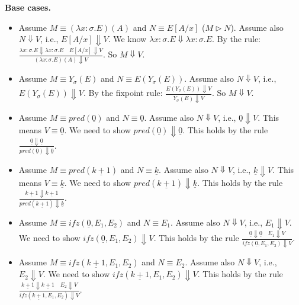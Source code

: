     \textbf{Base cases.}
    \begin{itemize}
        \item Assume $M \equiv (\lambda x:\sigma.E)(A)$ and $N \equiv E[A/x]$ ($M \rhd N$). Assume also $N \Downarrow V$, i.e., $E[A/x] \Downarrow V$.
              We know $\lambda x:\sigma.E \Downarrow \lambda x:\sigma.E$.
              By the rule: $\frac{\lambda x:\sigma.E \Downarrow \lambda x:\sigma.E \quad E[A/x] \Downarrow V}{(\lambda x:\sigma.E)(A) \Downarrow V}$. So $M \Downarrow V$.
    
        \item Assume $M \equiv Y_{\sigma}(E)$ and $N \equiv E(Y_{\sigma}(E))$.
              Assume also $N \Downarrow V$, i.e., $E(Y_{\sigma}(E)) \Downarrow V$.
              By the fixpoint rule: $\frac{E(Y_{\sigma}(E)) \Downarrow V}{Y_{\sigma}(E) \Downarrow V}$. So $M \Downarrow V$.

        \item Assume $M \equiv pred(\underline{0})$ and $N \equiv \underline{0}$.
              Assume also $N \Downarrow V$, i.e., $\underline{0} \Downarrow V$. This means $V \equiv \underline{0}$.
              We need to show $pred(\underline{0}) \Downarrow \underline{0}$. This holds by the rule $\frac{\underline{0} \Downarrow \underline{0}}{pred(\underline{0}) \Downarrow \underline{0}}$.

        \item Assume $M \equiv pred(\underline{k+1})$ and $N \equiv \underline{k}$.
              Assume also $N \Downarrow V$, i.e., $\underline{k} \Downarrow V$. This means $V \equiv \underline{k}$.
              We need to show $pred(\underline{k+1}) \Downarrow \underline{k}$. This holds by the rule $\frac{\underline{k+1} \Downarrow \underline{k+1}}{pred(\underline{k+1}) \Downarrow \underline{k}}$.

        \item Assume $M \equiv ifz(\underline{0}, E_1, E_2)$ and $N \equiv E_1$.
              Assume also $N \Downarrow V$, i.e., $E_1 \Downarrow V$.
              We need to show $ifz(\underline{0}, E_1, E_2) \Downarrow V$. This holds by the rule $\frac{\underline{0} \Downarrow \underline{0} \quad E_1 \Downarrow V}{ifz(\underline{0}, E_1, E_2) \Downarrow V}$.

        \item Assume $M \equiv ifz(\underline{k+1}, E_1, E_2)$ and $N \equiv E_2$.
              Assume also $N \Downarrow V$, i.e., $E_2 \Downarrow V$.
              We need to show $ifz(\underline{k+1}, E_1, E_2) \Downarrow V$. This holds by the rule $\frac{\underline{k+1} \Downarrow \underline{k+1} \quad E_2 \Downarrow V}{ifz(\underline{k+1}, E_1, E_2) \Downarrow V}$.
    \end{itemize}

